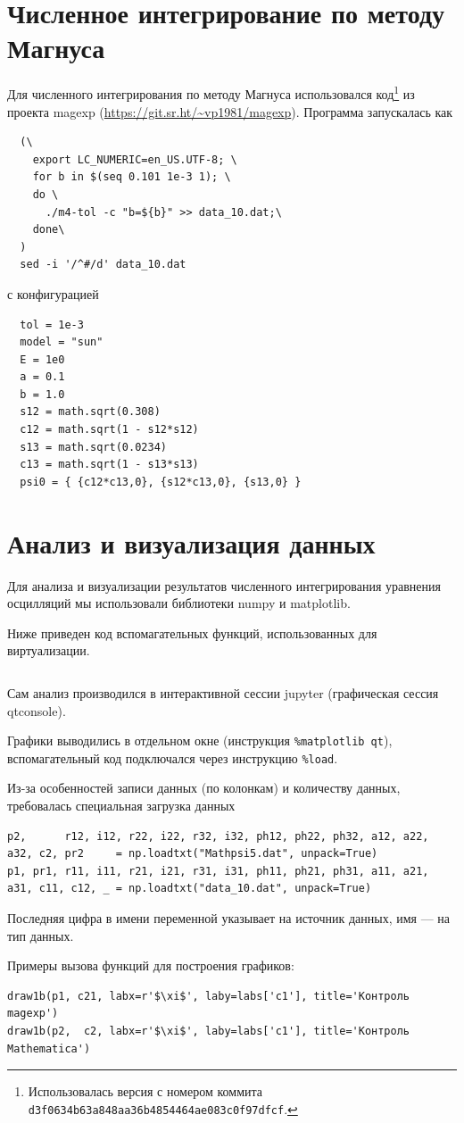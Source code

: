 \documentclass[a4paper,12pt]{article}
\begin{document}
\newpage
\section{Численное интегрирование по методу Магнуса}

Для численного интегрирования по методу Магнуса использовался
код\footnote{Использовалась версия с номером коммита
  \texttt{d3f0634b63a848aa36b4854464ae083c0f97dfcf}.} из проекта magexp
(\url{https://git.sr.ht/~vp1981/magexp}). Программа
запускалась как
\begin{verbatim}
  (\
    export LC_NUMERIC=en_US.UTF-8; \
    for b in $(seq 0.101 1e-3 1); \
    do \
      ./m4-tol -c "b=${b}" >> data_10.dat;\
    done\
  )
  sed -i '/^#/d' data_10.dat
\end{verbatim}
с конфигурацией
\begin{verbatim}
  tol = 1e-3
  model = "sun"
  E = 1e0
  a = 0.1
  b = 1.0
  s12 = math.sqrt(0.308)
  c12 = math.sqrt(1 - s12*s12)
  s13 = math.sqrt(0.0234)
  c13 = math.sqrt(1 - s13*s13)
  psi0 = { {c12*c13,0}, {s12*c13,0}, {s13,0} }
\end{verbatim}

\newpage
\section{Анализ и визуализация данных}
\label{app:sec:python}

Для анализа и визуализации результатов численного интегрирования уравнения
осцилляций мы использовали библиотеки numpy и matplotlib.

Ниже приведен код вспомагательных функций, использованных для виртуализации.%
\inputminted[linenos,fontsize=\footnotesize,escapeinside=||]{python}{draw-funcs.py}%
Сам анализ производился в интерактивной сессии jupyter (графическая сессия
qtconsole).

Графики выводились в отдельном окне (инструкция \texttt{\%matplotlib qt}),
вспомагательный код подключался через инструкцию \texttt{\%load}.

Из-за особенностей записи данных (по колонкам) и количеству данных, требовалась
специальная загрузка данных
\begin{verbatim}
p2,      r12, i12, r22, i22, r32, i32, ph12, ph22, ph32, a12, a22, a32, c2, pr2     = np.loadtxt("Mathpsi5.dat", unpack=True)
p1, pr1, r11, i11, r21, i21, r31, i31, ph11, ph21, ph31, a11, a21, a31, c11, c12, _ = np.loadtxt("data_10.dat", unpack=True)
\end{verbatim}
Последняя цифра в имени переменной указывает на источник данных, имя — на тип
данных.

Примеры вызова функций для построения графиков:
\begin{verbatim}
draw1b(p1, c21, labx=r'$\xi$', laby=labs['c1'], title='Контроль magexp')
draw1b(p2,  c2, labx=r'$\xi$', laby=labs['c1'], title='Контроль Mathematica')
\end{verbatim}
\end{document}
